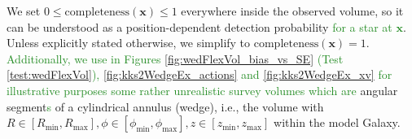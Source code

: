 \documentclass[iop,revtex4]{emulateapj}
\newcommand{\vect}[1]{\boldsymbol{#1}}
\newcommand{\NEW}[1]{\textcolor{ForestGreen}{#1}}
\newcommand{\OLD}[1]{}
\begin{document}
\begin{appendix}
\OLD{The SF of the SEGUE survey \citep{2012ApJ...753..148B} used by BR13 consists of many pencil-beams. In anticipation of large contiguous volume surveys like Gaia, we use SFs that span large observed volumes of simple geometrical shapes: a sphere of radius $r_\text{max}$ with the Sun at its center; or an angular segment of an cylindrical annulus (wedge), i.e., the volume with $R \in [R_\text{min},R_\text{max}],\phi \in [\phi_\text{min},\phi_\text{max}],z \in [z_\text{min},z_\text{max}]$ within the model Galaxy. The sharp outer edge of the survey volume could be interpreted as a detection limit in apparent brightness in the case where all stars have the same luminosity.} We set $0 \leq \text{completeness}(\vect{x}) \leq 1$ everywhere inside the observed volume, so it can be understood as a position-dependent detection probability \NEW{for a star at $\vect{x}$}. Unless explicitly stated otherwise, we simplify to $\text{completeness}(\vect{x}) = 1$. \NEW{Additionally, we use in Figures \ref{fig:wedFlexVol_bias_vs_SE} (Test \ref{test:wedFlexVol}), \ref{fig:kks2WedgeEx_actions} and \ref{fig:kks2WedgeEx_xv} for illustrative purposes some rather unrealistic survey volumes which are} angular segment\NEW{s} of a cylindrical annulus (wedge), i.e., the volume with $R \in [R_\text{min},R_\text{max}],\phi \in [\phi_\text{min},\phi_\text{max}],z \in [z_\text{min},z_\text{max}]$ within the model Galaxy. 



\end{appendix}
\end{document}
